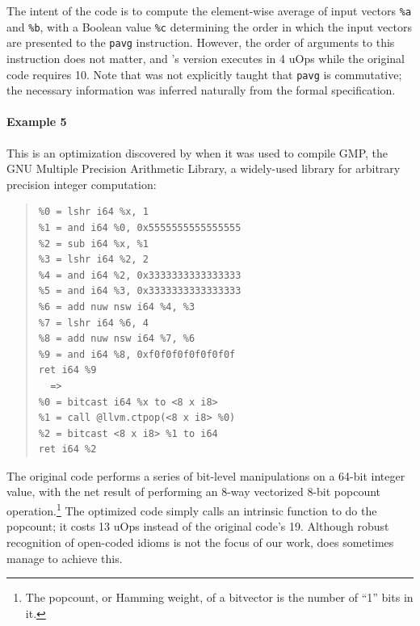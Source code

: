 The intent of the code is to compute the element-wise average of input
vectors \texttt{\%a} and \texttt{\%b}, with a Boolean value
\texttt{\%c} determining the order in which the input vectors are
presented to the \texttt{pavg} instruction.
%
However, the order of arguments to this instruction does not matter, and
\minotaur's version executes in 4 uOps while the original code requires
10.
%
Note that \minotaur{} was not explicitly taught that \texttt{pavg} is
commutative; the necessary information was inferred naturally from the
formal specification.


\paragraph*{Example 5}

This is an optimization discovered
by \minotaur{} when it was used to compile GMP, the GNU Multiple Precision
Arithmetic Library, a widely-used library for arbitrary precision
integer computation:


{\begin{quote}\begin{verbatim}
%0 = lshr i64 %x, 1
%1 = and i64 %0, 0x5555555555555555
%2 = sub i64 %x, %1
%3 = lshr i64 %2, 2
%4 = and i64 %2, 0x3333333333333333
%5 = and i64 %3, 0x3333333333333333
%6 = add nuw nsw i64 %4, %3
%7 = lshr i64 %6, 4
%8 = add nuw nsw i64 %7, %6
%9 = and i64 %8, 0xf0f0f0f0f0f0f0f
ret i64 %9
  =>
%0 = bitcast i64 %x to <8 x i8>
%1 = call @llvm.ctpop(<8 x i8> %0)
%2 = bitcast <8 x i8> %1 to i64
ret i64 %2
\end{verbatim}
\end{quote}}

%
%
The original code performs a series of bit-level
manipulations on a 64-bit integer value, with the net result of
performing an 8-way vectorized 8-bit popcount operation.\footnote{The
popcount, or Hamming weight, of a bitvector is the number of ``1''
bits in it.}
%
The optimized code simply calls an intrinsic function to do the
popcount; it costs 13 uOps instead of the original code's 19.
%
Although robust recognition of open-coded idioms is not the focus
of our work, \minotaur{} does sometimes manage to achieve this.

